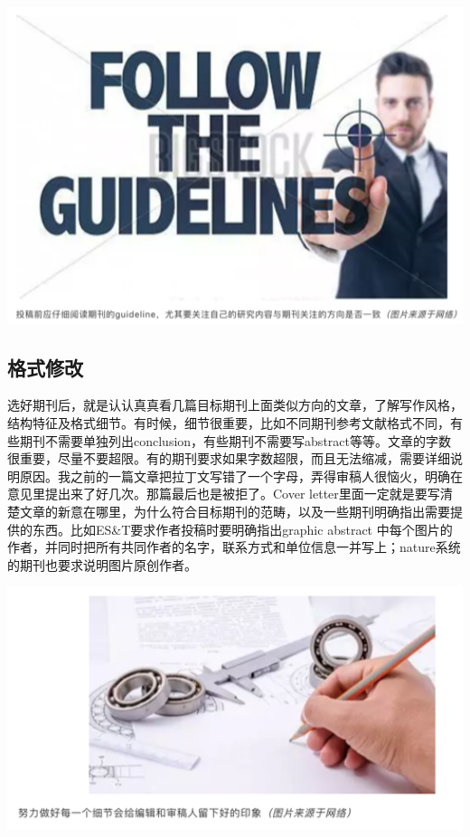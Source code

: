 \documentclass[
]{book}
\begin{document}
\includegraphics[width=6.67in]{images/tougao2}

\hypertarget{ux683cux5f0fux4feeux6539}{%
\subsection{格式修改}\label{ux683cux5f0fux4feeux6539}}

选好期刊后，就是认认真真看几篇目标期刊上面类似方向的文章，了解写作风格，结构特征及格式细节。有时候，细节很重要，比如不同期刊参考文献格式不同，有些期刊不需要单独列出conclusion，有些期刊不需要写abstract等等。文章的字数很重要，尽量不要超限。有的期刊要求如果字数超限，而且无法缩减，需要详细说明原因。我之前的一篇文章把拉丁文写错了一个字母，弄得审稿人很恼火，明确在意见里提出来了好几次。那篇最后也是被拒了。Cover letter里面一定就是要写清楚文章的新意在哪里，为什么符合目标期刊的范畴，以及一些期刊明确指出需要提供的东西。比如ES\&T要求作者投稿时要明确指出graphic abstract 中每个图片的作者，并同时把所有共同作者的名字，联系方式和单位信息一并写上；nature系统的期刊也要求说明图片原创作者。

\includegraphics[width=6.67in]{images/tougao3}
\end{document}
